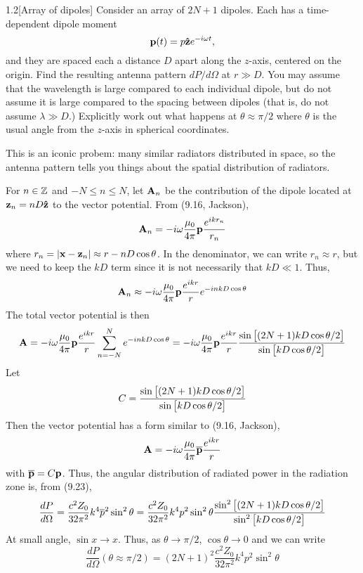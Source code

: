 \documentclass[12pt]{article}
\begin{document}
\begin{problem}{1.2}[Array of dipoles]
Consider an array of $2N+1$ dipoles. Each has a time-dependent dipole moment
\begin{equation}
    \vb{p}(t)=p\vb{\hat{z}} e^{-i\omega t}, 
\end{equation}
and they are spaced each a distance $D$ apart along the $z$-axis, centered on
the origin. Find the resulting antenna pattern $dP/d\Omega$ at $r\gg D$. You may
assume that the wavelength is large compared to each individual dipole, but do
not assume it is large compared to the spacing between dipoles (that is, do not
assume $\lambda\gg D$.) Explicitly work out what happens at $\theta\approx\pi/2$
where $\theta$ is the usual angle from the $z$-axis in spherical coordinates.

This is an iconic probem: many similar radiators distributed in space, so the
antenna pattern tells you things about the spatial distribution of radiators.
\begin{solution}
For $n\in\mathbb{Z}$ and $-N\leq n\leq N$, let $\vb{A}_n$ be the contribution of the
dipole located at $\vb{z}_n=nD\vb{\hat{z}}$ to the vector potential. From (9.16,
Jackson),
\begin{equation}
    \vb{A}_n=-i\omega\frac{\mu_0}{4\pi}\vb{p}\frac{e^{ikr_n}}{r_n} 
\end{equation}
where $r_n=\abs{\vb{x}-\vb{z}_n}\approx r-nD\cos\theta$. In the denominator, we
can write $r_n\approx r$, but we need to keep the $kD$ term since it is not
necessarily that $kD\ll 1$. Thus,
\begin{equation}
    \vb{A}_n\approx-i\omega\frac{\mu_0}{4\pi}\vb{p}\frac{e^{ikr}}{r}e^{-inkD\cos\theta} 
\end{equation}
The total vector potential is then
\begin{equation}
    \vb{A}=-i\omega\frac{\mu_0}{4\pi}\vb{p}\frac{e^{ikr}}{r}\sum_{n=-N}^Ne^{-inkD\cos\theta}
    =-i\omega\frac{\mu_0}{4\pi}\vb{p}\frac{e^{ikr}}{r}\frac{\sin\qty[(2N+1)kD\cos\theta/2]}{\sin\qty[kD\cos\theta/2]}
\end{equation}
Let
\begin{equation}
    C=\frac{\sin\qty[(2N+1)kD\cos\theta/2]}{\sin\qty[kD\cos\theta/2]}
\end{equation}
Then the vector potential has a form similar to (9.16, Jackson),
\begin{equation}
    \vb{A}=-i\omega\frac{\mu_0}{4\pi}\vb{\overline{p}}\frac{e^{ikr}}{r} 
\end{equation}
with $\overline{\vb{p}}=C\vb{p}$. Thus, the angular distribution of radiated
power in the radiation zone is, from (9.23),
\begin{equation}
    \frac{dP}{d\Omega}=\frac{c^2Z_0}{32\pi^2}k^4\overline{p}^2\sin^2\theta
    =\frac{c^2Z_0}{32\pi^2}k^4p^2\sin^2\theta\frac{\sin^2\qty[(2N+1)kD\cos\theta/2]}{\sin^2\qty[kD\cos\theta/2]}
\end{equation}
At small angle, $\sin x\to x$. Thus, as $\theta\to\pi/2$, $\cos\theta\to0$ and
we can write
\begin{equation}
    \frac{dP}{d\Omega}(\theta\approx\pi/2)=(2N+1)^2\frac{c^2Z_0}{32\pi^2}k^4p^2\sin^2\theta 
\end{equation}
\end{solution}
\end{problem}
\end{document}

